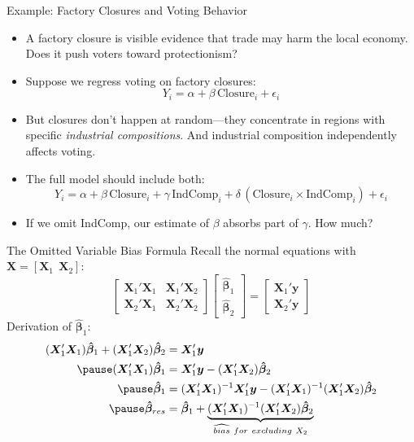 \documentclass[aspectratio=169, handout, t]{beamer}
\numberwithin{equation}{section}
\begin{document}
\begin{frame}{Example: Factory Closures and Voting Behavior}
  \begin{itemize}
    \item A factory closure is visible evidence that trade may harm the local economy. Does it push voters toward protectionism?\pause
    \item Suppose we regress voting on factory closures:
  \[
  Y_i = \alpha + \beta\,\text{Closure}_i + \epsilon_i
  \]
    \item But closures don't happen at random---they concentrate in regions with specific \emph{industrial compositions}. And industrial composition independently affects voting.\pause
    \item The full model should include both:
  \[
  Y_i = \alpha + \beta\,\text{Closure}_i + \gamma\,\text{IndComp}_i + \delta\,(\text{Closure}_i \times \text{IndComp}_i) + \epsilon_i
  \]
    \item If we omit IndComp, our estimate of $\beta$ absorbs part of $\gamma$. How much?
  \end{itemize}
\end{frame}


\begin{frame}{The Omitted Variable Bias Formula}
Recall the normal equations with $\bm{X}=[\bm{X}_1\ \ \bm{X}_2]$:
$$\begin{bmatrix} \bm{X}_1'\bm{X}_1& \bm{X}_1'\bm{X}_2\\  \bm{X}_2'\bm{X}_1 &\bm{X}_2'\bm{X}_2 \end{bmatrix} \begin{bmatrix}\bm{\hat{\beta}}_1\\ \bm{\hat{\beta}}_2\end{bmatrix}=\begin{bmatrix}\bm{X}_1'\bm{y}\\ \bm{X}_2'\bm{y}\end{bmatrix}$$\pause
Derivation of $\bm{\hat{\beta}}_1$:
\begin{align*}
(\bm{X}_1'\bm{X}_1)\bm{\hat{\beta}}_1+(\bm{X}_1'\bm{X}_2)\bm{\hat{\beta}}_2&=\bm{X}'_1\bm{y}\\\pause
(\bm{X}_1'\bm{X}_1)\bm{\hat{\beta}}_1&=\bm{X}'_1\bm{y}-(\bm{X}_1'\bm{X}_2)\bm{\hat{\beta}}_2\\\pause
\bm{\hat{\beta}}_1&=(\bm{X}_1'\bm{X}_1)^{-1}\bm{X}'_1\bm{y}-(\bm{X}_1'\bm{X}_1)^{-1}(\bm{X}_1'\bm{X}_2)\bm{\hat{\beta}}_2\\ \pause
\bm{\hat{\beta}}_{res}&=\bm{\hat{\beta}}_1+\underbrace{(\bm{X}_1'\bm{X}_1)^{-1}(\bm{X}_1'\bm{X}_2)\bm{\hat{\beta}}_2}_{\widehat{bias}\ for\ excluding\ X_2}
\end{align*}
\end{frame}
\end{document}
